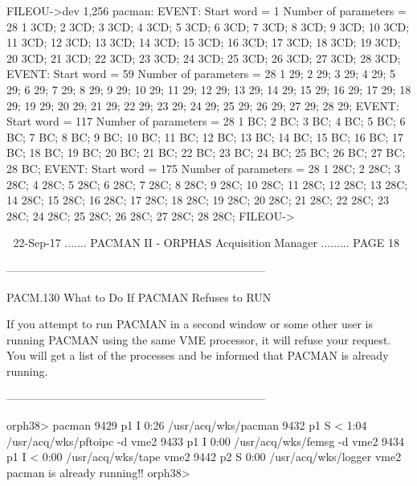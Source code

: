    FILEOU->dev 1,256
   pacman: EVENT: Start word =    1 Number of parameters =  28
      1  3CD;     2  3CD;     3  3CD;     4  3CD;     5  3CD;     6  3CD;
      7  3CD;     8  3CD;     9  3CD;    10  3CD;    11  3CD;    12  3CD;
     13  3CD;    14  3CD;    15  3CD;    16  3CD;    17  3CD;    18  3CD;
     19  3CD;    20  3CD;    21  3CD;    22  3CD;    23  3CD;    24  3CD;
     25  3CD;    26  3CD;    27  3CD;    28  3CD;
   EVENT: Start word =   59 Number of parameters =  28
      1   29;     2   29;     3   29;     4   29;     5   29;     6   29;
      7   29;     8   29;     9   29;    10   29;    11   29;    12   29;
     13   29;    14   29;    15   29;    16   29;    17   29;    18   29;
     19   29;    20   29;    21   29;    22   29;    23   29;    24   29;
     25   29;    26   29;    27   29;    28   29;
   EVENT: Start word =  117 Number of parameters =  28
      1   BC;     2   BC;     3   BC;     4   BC;     5   BC;     6   BC;
      7   BC;     8   BC;     9   BC;    10   BC;    11   BC;    12   BC;
     13   BC;    14   BC;    15   BC;    16   BC;    17   BC;    18   BC;
     19   BC;    20   BC;    21   BC;    22   BC;    23   BC;    24   BC;
     25   BC;    26   BC;    27   BC;    28   BC;
   EVENT: Start word =  175 Number of parameters =  28
      1  28C;     2  28C;     3  28C;     4  28C;     5  28C;     6  28C;
      7  28C;     8  28C;     9  28C;    10  28C;    11  28C;    12  28C;
     13  28C;    14  28C;    15  28C;    16  28C;    17  28C;    18  28C;
     19  28C;    20  28C;    21  28C;    22  28C;    23  28C;    24  28C;
     25  28C;    26  28C;    27  28C;    28  28C;
   FILEOU->
 
    
   22-Sep-17 ....... PACMAN II - ORPHAS Acquisition Manager ......... PAGE  18
 
     ---------------------------------------------------------------------
 
   PACM.130 What to Do If PACMAN Refuses to RUN
 
   If you attempt to run PACMAN in a second  window  or  some  other  user  is
   running  PACMAN  using the same VME processor, it will refuse your request.
   You will get a list of  the  processes  and  be  informed  that  PACMAN  is
   already running.
 
     ---------------------------------------------------------------------
 
   orph38> pacman
    9429 p1 I      0:26 /usr/acq/wks/pacman
    9432 p1 S <    1:04 /usr/acq/wks/pftoipc -d vme2
    9433 p1 I      0:00 /usr/acq/wks/femsg -d vme2
    9434 p1 I <    0:00 /usr/acq/wks/tape vme2
    9442 p2 S      0:00 /usr/acq/wks/logger vme2
   pacman is already running!!
   orph38>
 
